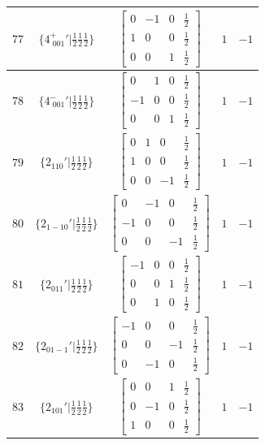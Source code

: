 \documentclass[fleqn,8pt]{jsarticle}
\begin{document}
\begin{longtable}{ccccc}
$ 77 $ & $ \{4^{+}_{\,\,001}{}'|\frac{1}{2} \frac{1}{2} \frac{1}{2}\} $ & $ \begin{bmatrix} 0 & -1 & 0 & \frac{1}{2} \\ 1 & 0 & 0 & \frac{1}{2} \\ 0 & 0 & 1 & \frac{1}{2} \end{bmatrix} $ & $ 1 $ & $ -1 $ \\ \hline
$ 78 $ & $ \{4^{-}_{\,\,001}{}'|\frac{1}{2} \frac{1}{2} \frac{1}{2}\} $ & $ \begin{bmatrix} 0 & 1 & 0 & \frac{1}{2} \\ -1 & 0 & 0 & \frac{1}{2} \\ 0 & 0 & 1 & \frac{1}{2} \end{bmatrix} $ & $ 1 $ & $ -1 $ \\ \hline
$ 79 $ & $ \{2{}_{110}{}'|\frac{1}{2} \frac{1}{2} \frac{1}{2}\} $ & $ \begin{bmatrix} 0 & 1 & 0 & \frac{1}{2} \\ 1 & 0 & 0 & \frac{1}{2} \\ 0 & 0 & -1 & \frac{1}{2} \end{bmatrix} $ & $ 1 $ & $ -1 $ \\ \hline
$ 80 $ & $ \{2{}_{1-10}{}'|\frac{1}{2} \frac{1}{2} \frac{1}{2}\} $ & $ \begin{bmatrix} 0 & -1 & 0 & \frac{1}{2} \\ -1 & 0 & 0 & \frac{1}{2} \\ 0 & 0 & -1 & \frac{1}{2} \end{bmatrix} $ & $ 1 $ & $ -1 $ \\ \hline
$ 81 $ & $ \{2{}_{011}{}'|\frac{1}{2} \frac{1}{2} \frac{1}{2}\} $ & $ \begin{bmatrix} -1 & 0 & 0 & \frac{1}{2} \\ 0 & 0 & 1 & \frac{1}{2} \\ 0 & 1 & 0 & \frac{1}{2} \end{bmatrix} $ & $ 1 $ & $ -1 $ \\ \hline
$ 82 $ & $ \{2{}_{01-1}{}'|\frac{1}{2} \frac{1}{2} \frac{1}{2}\} $ & $ \begin{bmatrix} -1 & 0 & 0 & \frac{1}{2} \\ 0 & 0 & -1 & \frac{1}{2} \\ 0 & -1 & 0 & \frac{1}{2} \end{bmatrix} $ & $ 1 $ & $ -1 $ \\ \hline
$ 83 $ & $ \{2{}_{101}{}'|\frac{1}{2} \frac{1}{2} \frac{1}{2}\} $ & $ \begin{bmatrix} 0 & 0 & 1 & \frac{1}{2} \\ 0 & -1 & 0 & \frac{1}{2} \\ 1 & 0 & 0 & \frac{1}{2} \end{bmatrix} $ & $ 1 $ & $ -1 $ \\ \hline

\end{longtable}
\end{document}

